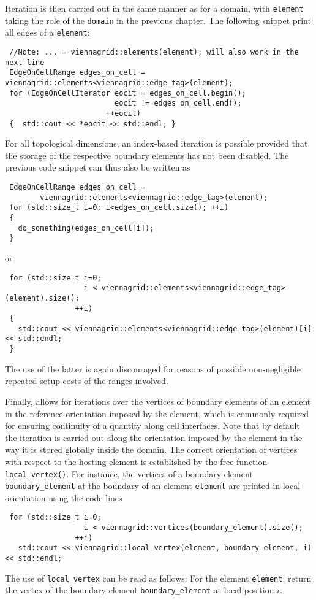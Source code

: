 Iteration is then carried out in the same manner as for a domain, with \lstinline|element| taking the role of the \lstinline|domain| in the previous chapter.
The following snippet print all edges of a \lstinline|element|:
\begin{lstlisting}
 //Note: ... = viennagrid::elements(element); will also work in the next line
 EdgeOnCellRange edges_on_cell = viennagrid::elements<viennagrid::edge_tag>(element);
 for (EdgeOnCellIterator eocit = edges_on_cell.begin();
                         eocit != edges_on_cell.end();
                       ++eocit)
 {  std::cout << *eocit << std::endl; } 
\end{lstlisting}

For all topological dimensions, an index-based iteration is possible provided that the storage of the respective boundary elements has not been disabled. The previous code snippet can thus also be written as
\begin{lstlisting}
 EdgeOnCellRange edges_on_cell =
        viennagrid::elements<viennagrid::edge_tag>(element);
 for (std::size_t i=0; i<edges_on_cell.size(); ++i)
 { 
   do_something(edges_on_cell[i]);
 }
\end{lstlisting}
or
\begin{lstlisting}
 for (std::size_t i=0;
                  i < viennagrid::elements<viennagrid::edge_tag>(element).size();
                ++i)
 {
   std::cout << viennagrid::elements<viennagrid::edge_tag>(element)[i] << std::endl;
 }
\end{lstlisting}
The use of the latter is again discouraged for reasons of possible non-negligible repeated setup costs of the ranges involved.


Finally, {\ViennaGrid} allows for iterations over the vertices of boundary elements of an element in the reference orientation imposed by the element, which is commonly required for ensuring continuity of a quantity along cell interfaces. Note that by default the iteration is carried out along the orientation imposed by the element in the way it is stored globally inside the domain.
The correct orientation of vertices with respect to the hosting element is established by the free function \lstinline|local_vertex()|. 
For instance, the vertices of a boundary element \lstinline|boundary_element| at the boundary of an element \lstinline|element| are printed in local orientation using the code lines
\begin{lstlisting}
 for (std::size_t i=0;
                  i < viennagrid::vertices(boundary_element).size();
                ++i)
   std::cout << viennagrid::local_vertex(element, boundary_element, i) << std::endl;
\end{lstlisting}
The use of \lstinline|local_vertex| can be read as follows: For the element \lstinline|element|, return the vertex of the boundary element \lstinline|boundary_element| at local position $i$.

